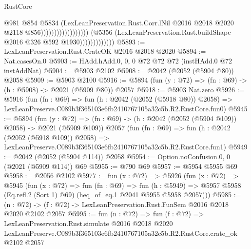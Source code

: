 \begin{lexlean}{RustCore}
\begin{coremodule}
                                                            @981
                                                            @854
                                                            @5834
                                                            (LexLeanPreservation.Rust.Corr.lNil
                                                              @2016
                                                              @2018
                                                              @2020
                                                              @2118
                                                              @856))))))))))))))))))
                          (@5356
                            (LexLeanPreservation.Rust.buildShape @2016 @326 @592 @1930)))))))))))))
@5893 := LexLeanPreservation.Rust.CrateOK @2016 @2018 @2020
@5894 := Nat.casesOn.{0}
@5903 := HAdd.hAdd.{0, 0, 0} @72 @72 @72 (instHAdd.{0} @72 instAddNat)
@5904 := @5903 @2102
@5908 := @2042 (@2052 (@5904 @80)) @2058
@5909 := @5903 @2100
@5916 := @5894 (fun (y : @72) => (fn : @69) -> (h : @5908) -> @2021 (@5909 @80)) @2057
@5918 := @5903 Nat.zero
@5926 := @5916
    (fun (fn : @69) =>
    fun (h : @2042 (@2052 (@5918 @80)) @2058) =>
    LexLeanPreserve.C089b3f365103e6fb2410767105a32c5b.R2.RustCore.fun0)
@5945 := @5894
    (fun (y : @72) => (fn : @69) -> (h : @2042 (@2052 (@5904 @109)) @2058) -> @2021 (@5909 @109))
    @2057
    (fun (fn : @69) =>
    fun (h : @2042 (@2052 (@5918 @109)) @2058) =>
    LexLeanPreserve.C089b3f365103e6fb2410767105a32c5b.R2.RustCore.fun1)
@5949 := @2042 (@2052 (@5904 @114)) @2058
@5954 := Option.noConfusion.{0, 0} (@2021 (@5909 @114)) @69
@5955 := @790 @69
@5957 := @5954 @5955 @69
@5958 := @2056 @2102
@5977 := fun (x : @72) =>
  @5926
    (fun (x : @72) =>
    @5945
      (fun (x : @72) =>
      fun (fn : @69) =>
      fun (h : @5949) =>
      @5957 @5958 (Eq.refl.{2} (Sort 1) @69) (heq_of_eq.{1} @2041 @5955 @5958 @2057)))
@5985 := (n : @72) -> (f : @72) -> LexLeanPreservation.Rust.FunSem @2016 @2018 @2020 @2102 @2057
@5995 := fun (n : @72) =>
  fun (f : @72) =>
  LexLeanPreservation.Rust.simulate
    @2016
    @2018
    @2020
    LexLeanPreserve.C089b3f365103e6fb2410767105a32c5b.R2.RustCore.crate_ok
    @2102
    @2057
\end{coremodule}
\end{lexlean}
